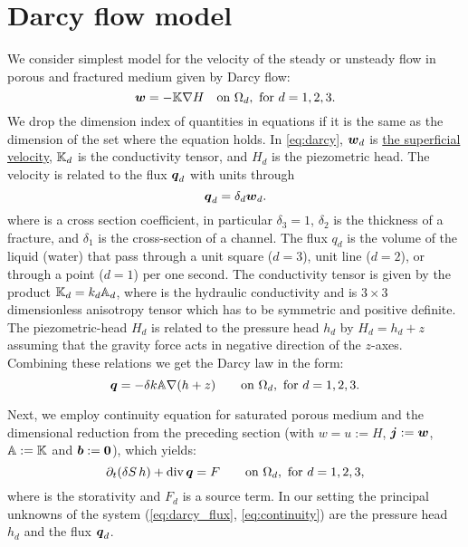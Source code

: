 
\section{Darcy flow model}
We consider simplest model for the velocity of the steady or unsteady flow in porous and fractured medium given by 
Darcy flow:
\begin{equation}
    \label{eq:darcy}
    \vc w = -\tn K \grad H \quad\text{on }\Omega_d,\ \text{for $d=1,2,3$}.
\end{equation}
We drop the dimension index of quantities in equations if it is the same as the dimension of the set where the equation holds.
In \eqref{eq:darcy}, $\mathbf{\boldsymbol{w}}_d$  is \href{http://en.wikipedia.org/wiki/Superficial_velocity}{the superficial velocity},
${\mathbb{K}}_d$ is the conductivity tensor, and $H_d$  is the piezometric head. The velocity is related to the flux $\mathbf{\boldsymbol{q}}_d$ 
with units  through
\[
    \mathbf{\boldsymbol{q}}_d = \delta_d \mathbf{\boldsymbol{w}}_d.
\]
where 
 is a cross section coefficient, in particular $\delta_3=1$, $\delta_2$  is the thickness of a fracture, and $\delta_1$  is the cross-section of a channel.
The flux $q_d$ is the volume of the liquid (water) that pass through a unit square ($d=3$),
unit line ($d=2$), or through a point ($d=1$) per one second. 
The conductivity tensor is given by the product 
${\mathbb{K}}_d = k_d {\mathbb{A}}_d$, where 
 is the hydraulic conductivity  and 
 is 
$3\times 3$ dimensionless anisotropy tensor which has to be symmetric and positive definite. The piezometric-head $H_d$ is related to the pressure head
$h_d$ by $H_d = h_d + z$ assuming that the gravity force acts in negative direction of the $z$-axes. 
Combining these relations we get the Darcy law in the form:
\begin{equation}
    \label{eq:darcy_flux}
    \vc q = -\delta k\tn A \grad (h+z)  \qquad\text{on }\Omega_d,\ \text{for $d=1,2,3$}.
\end{equation}

Next, we employ continuity equation for saturated porous medium and the dimensional reduction from the preceding section (with $w=u:=H$, $\mathbf{\boldsymbol{j}}:=\mathbf{\boldsymbol{w}}$, ${\mathbb{A}}:={\mathbb{K}}$ and $\mathbf{\boldsymbol{b}}:=\mathbf{\boldsymbol{0}}$), which yields:
\begin{equation}
    \label{eq:continuity}
    \prtl_t (\delta S\, h) + \div \vc q = F \qquad \text{on }\Omega_d,\ \text{for $d=1,2,3$},
\end{equation}
where   is the storativity and $F_d$  is a source term. In our setting the principal unknowns of the system 
(\ref{eq:darcy_flux}, \ref{eq:continuity}) are the pressure head $h_d$ and the flux $\mathbf{\boldsymbol{q}}_d$.


